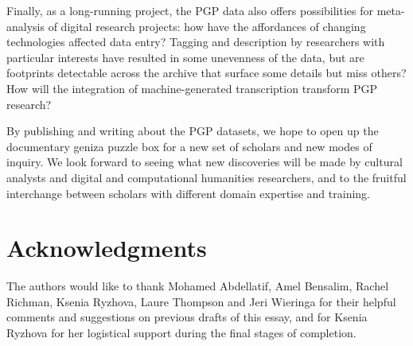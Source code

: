\documentclass{article}
\begin{document}
Finally, as a long-running project, the PGP data also offers possibilities for meta-analysis of digital research projects: how have the affordances of changing technologies affected data entry? Tagging and description by researchers with particular interests have resulted in some unevenness of the data, but are footprints detectable across the archive that surface some details but miss others? How will the integration of machine-generated transcription transform PGP research?

By publishing and writing about the PGP datasets, we hope to open up the documentary geniza puzzle box for a new set of scholars and new modes of inquiry. We look forward to seeing what new discoveries will be made by cultural analysts and digital and computational humanities researchers, and to the fruitful interchange between scholars with different domain expertise and training.

\section*{Acknowledgments}
The authors would like to thank Mohamed Abdellatif, Amel Bensalim, Rachel Richman, Ksenia Ryzhova, Laure Thompson and Jeri Wieringa for their helpful comments and suggestions on previous drafts of this essay, and for Ksenia Ryzhova for her logistical support during the final stages of completion.

\pagebreak
{}

\printbibliography[prenote={preamble}]
\end{document}
